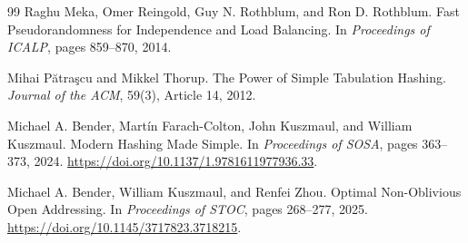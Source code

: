 \documentclass[12pt]{article}
\begin{document}
\begin{thebibliography}{99}
Raghu Meka, Omer Reingold, Guy N. Rothblum, and Ron D. Rothblum.
\newblock Fast Pseudorandomness for Independence and Load Balancing.
\newblock In \textit{Proceedings of ICALP}, pages 859--870, 2014.

Mihai Pătraşcu and Mikkel Thorup.
\newblock The Power of Simple Tabulation Hashing.
\newblock \textit{Journal of the ACM}, 59(3), Article 14, 2012.

Michael A. Bender, Martín Farach-Colton, John Kuszmaul, and William Kuszmaul.
\newblock Modern Hashing Made Simple.
\newblock In \textit{Proceedings of SOSA}, pages 363--373, 2024.
\newblock \url{https://doi.org/10.1137/1.9781611977936.33}.

Michael A. Bender, William Kuszmaul, and Renfei Zhou.
\newblock Optimal Non-Oblivious Open Addressing.
\newblock In \textit{Proceedings of STOC}, pages 268--277, 2025.
\newblock \url{https://doi.org/10.1145/3717823.3718215}.

\end{thebibliography}
\end{document}
